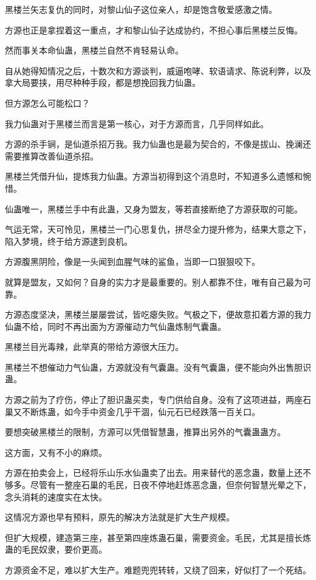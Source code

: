 \begin{this_body}
黑楼兰矢志复仇的同时，对黎山仙子这位亲人，却是饱含敬爱感激之情。

方源也正是拿捏着这一重点，才和黎山仙子达成协约，不担心事后黑楼兰反悔。

然而事关本命仙蛊，黑楼兰自然不肯轻易认命。

自从她得知情况之后，十数次和方源谈判，威逼咆哮、软语请求、陈说利弊，以及拿大局要挟，用尽种种手段，都是想挽回我力仙蛊。

但方源怎么可能松口？

我力仙蛊对于黑楼兰而言是第一核心，对于方源而言，几乎同样如此。

方源的杀手锏，是仙道杀招万我。我力仙蛊也是最为契合的，不像是拔山、挽澜还需要推算改善仙道杀招。

黑楼兰凭借升仙，提炼我力仙蛊。方源当初得到这个消息时，不知道多么遗憾和惋惜。

仙蛊唯一，黑楼兰手中有此蛊，又身为盟友，等若直接断绝了方源获取的可能。

气运无常，天可怜见，黑楼兰一门心思复仇，拼尽全力提升修为，结果大意之下，陷入梦境，终于给方源逮到良机。

方源腹黑阴险，像是一头闻到血腥气味的鲨鱼，当即一口狠狠咬下。

就算是盟友，又如何？自身的实力才是最重要的。别人都靠不住，唯有自己最为可靠。

方源态度坚决，黑楼兰屡屡尝试，皆吃瘪失败。气极之下，便故意扣着方源的我力仙蛊不给，同时不再出面为方源催动力气仙蛊炼制气囊蛊。

黑楼兰目光毒辣，此举真的带给方源很大压力。

黑楼兰不想催动力气仙蛊，方源就没有气囊蛊。没有气囊蛊，便不能向外出售胆识蛊。

方源之前为了疗伤，停止了胆识蛊买卖，专门供给自身。没有了这项进益，两座石巢又不断炼蛊，如今手中资金几乎干涸，仙元石已经跌落一百关口。

要想突破黑楼兰的限制，方源可以凭借智慧蛊，推算出另外的气囊蛊蛊方。

这方面，又有不小的麻烦。

方源在拍卖会上，已经将乐山乐水仙蛊卖了出去。用来替代的恶念蛊，数量上还不够多。尽管有一整座石巢的毛民，日夜不停地赶炼恶念蛊，但奈何智慧光晕之下，念头消耗的速度实在太快。

这情况方源也早有预料，原先的解决方法就是扩大生产规模。

但扩大规模，建造第三座，甚至第四座炼蛊石巢，需要资金。毛民，尤其是擅长炼蛊的毛民奴隶，要价更高。

方源资金不足，难以扩大生产。难题兜兜转转，又绕了回来，好似打了一个死结。


\end{this_body}
